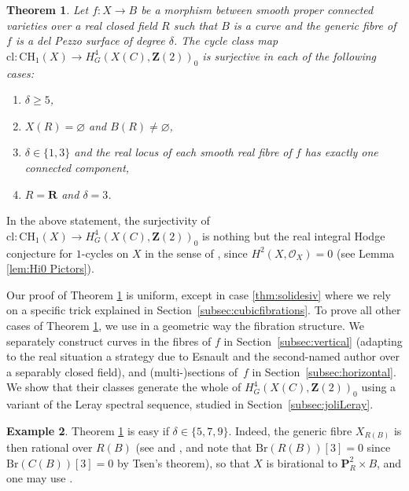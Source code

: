 \documentclass[JEP,XML,SOM,Unicode]{cedram}
\theoremstyle{plain}
\newtheorem{thm}{Theorem}[section]
\theoremstyle{definition}
\newtheorem{example}[thm]{Example}
\numberwithin{equation}{section}
\newcommand{\cl}{{\mathrm{cl}}}
\newcommand{\sO}{{\mathscr O}}
\renewcommand{\P}{{\mathbf P}}
\newcommand{\R}{{\mathbf R}}
\newcommand{\Z}{{\mathbf Z}}
\newcommand{\CH}{\mathrm{CH}}
\newcommand{\Br}{\mathrm{Br}}
\renewcommand{\emptyset}{\varnothing}
\begin{document}
\begin{thm}
\label{thm:solides fibres en del Pezzo}
Let $f:X\to B$ be a morphism between smooth proper connected varieties over a real closed field $R$ such that $B$ is a curve and the generic fibre of $f$ is a del Pezzo surface of degree $\delta$.
The cycle class map
$\cl:\CH_1(X)\to H^4_G(X(C),\Z(2))_0$ is surjective
in each of the following cases:
\begin{enumerate}
\item\label{thm:solidesi} $\delta\geq 5$,
\item\label{thm:solidesii} $X(R)=\emptyset$ and $B(R)\neq\emptyset$,
\item\label{thm:solidesiii} $\delta\in\{1,3\}$ and the real locus of each smooth real fibre of $f$ has exactly
one connected component,
\item\label{thm:solidesiv} $R=\R$ and $\delta=3$.
\end{enumerate}
\end{thm}

In the above statement, the surjectivity of $\cl:\CH_1(X)\to H^4_G(X(C),\Z(2))_0$ is nothing but
the real integral Hodge conjecture for $1$-cycles on $X$ in the sense of \cite[Def.\,\ref*{BW1-def:ihc real closed field}]{BW1}, since $H^2(X,\sO_X)=0$ (see Lemma \ref{lem:Hi0 Pictors}).

Our proof of Theorem \ref{thm:solides fibres en del Pezzo} is uniform, except in case \eqref{thm:solidesiv} where we rely on a specific trick explained in Section~\ref{subsec:cubicfibrations}.
To prove all other cases of Theorem \ref{thm:solides fibres en del Pezzo}, we use in a geometric way the fibration structure. We separately construct curves in the fibres of $f$ in Section~\ref{subsec:vertical} (adapting to the real situation a strategy due to Esnault and the second-named author \cite{ewzcl} over a separably closed field), and (multi-)sections of~$f$ in Section~\ref{subsec:horizontal}. We show that their classes generate the whole of $H^4_G(X(C),\Z(2))_0$ using a variant of the Leray spectral sequence, studied in Section~\ref{subsec:joliLeray}.

\begin{example}\label{exeasydP}
Theorem \ref{thm:solides fibres en del Pezzo} is easy if $\delta\in\{5,7,9\}$. Indeed, the generic fibre $X_{R(B)}$ is then rational over $R(B)$
(see \cite[Th.\,3.7 and Theorem~3.15]{maninrational} and \cite{Swinnerton-Dyer}, and note that $\Br(R(B))[3]=0$ since $\Br(C(B))[3]=0$ by Tsen's theorem), so that
$X$ is birational to $\P^2_R\times B$, and one may use \cite[Prop.\,\ref*{BW1-prop:birinvIHC}]{BW1}.
\end{example}
\end{document}
